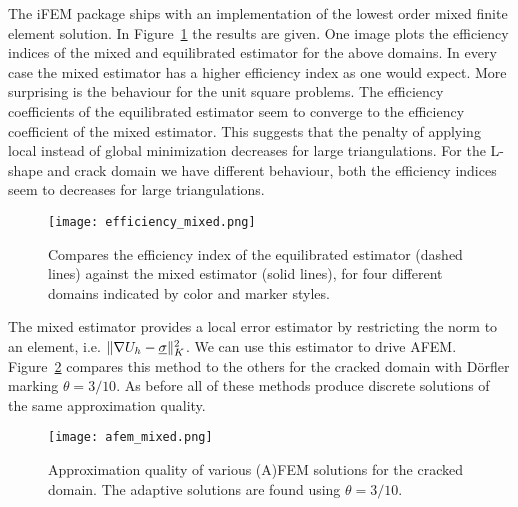 \documentclass[thesis.tex]{subfiles}
\begin{document}
The iFEM package ships with an implementation of the lowest order mixed finite element solution. In Figure~\ref{fig:effmixed} the results are given. One image plots the efficiency indices of the mixed and equilibrated estimator
for the above domains. In every case the mixed estimator has a higher efficiency index as one would expect. 
More surprising is the behaviour for the unit square problems. The efficiency coefficients of the equilibrated estimator
seem to  converge to the efficiency coefficient of the mixed estimator. This suggests that the penalty of applying
local instead of global minimization decreases for large triangulations. For the L-shape and crack domain we have different behaviour,
both the efficiency indices seem to decreases for large triangulations. 
\begin{figure}
  \centering
  \texttt{[image: efficiency\_mixed.png]}
  \caption{
    Compares the efficiency index of the equilibrated estimator (dashed lines) against the mixed estimator (solid lines), for
  four different domains indicated by color and marker styles.}
  \label{fig:effmixed}
\end{figure}

The mixed estimator provides a local error estimator by restricting the norm to an element, i.e. $\| \nabla U_h - \underline{\sigma} \|^2_K$. We
can use this estimator to drive AFEM. Figure~\ref{fig:afemmixed} compares this method to the others for the cracked domain with D\"orfler marking $\theta = 3/10$. 
As before all of these methods produce discrete solutions of the same approximation quality. 
\begin{figure}
  \centering
  \texttt{[image: afem\_mixed.png]}
  \caption{
    Approximation quality of various (A)FEM solutions for the cracked domain. The adaptive solutions are found using $\theta = 3/10$.
  }
  \label{fig:afemmixed}
\end{figure}
\end{document}
